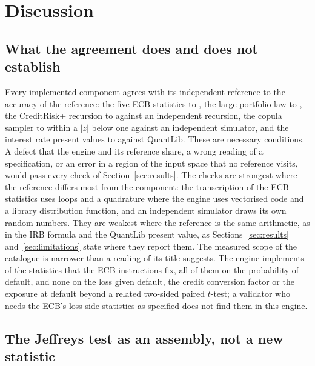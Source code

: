 \section{Discussion}
\label{sec:discussion}

\subsection{What the agreement does and does not establish}

Every implemented component agrees with its independent reference to the accuracy of the reference: the five ECB statistics to \ecbAllMax{}, the large-portfolio law to \lhpMax{}, the CreditRisk+ recursion to \crpIndMax{} against an independent recursion, the copula sampler to within a $|z|$ below one against an independent simulator, and the interest rate present values to \irrQlMax{} against QuantLib. These are necessary conditions. A defect that the engine and its reference share, a wrong reading of a specification, or an error in a region of the input space that no reference visits, would pass every check of Section~\ref{sec:results}. The checks are strongest where the reference differs most from the component: the transcription of the ECB statistics uses loops and a quadrature where the engine uses vectorised code and a library distribution function, and an independent simulator draws its own random numbers. They are weakest where the reference is the same arithmetic, as in the IRB formula and the QuantLib present value, as Sections~\ref{sec:results} and~\ref{sec:limitations} state where they report them. The measured scope of the catalogue is narrower than a reading of its title suggests. The engine implements \ecbImpl{} of the \ecbSections{} statistics that the ECB instructions fix, all of them on the probability of default, and none on the loss given default, the credit conversion factor or the exposure at default beyond a related two-sided paired $t$-test; a validator who needs the ECB's loss-side statistics as specified does not find them in this engine.

\subsection{The Jeffreys test as an assembly, not a new statistic}

